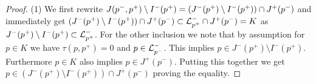 \begin{proof}
(1) We first rewrite $J(p^-,p^+)\setminus I^-(p^+)=(J^-(p^+)\setminus I^-(p^+))\cap J^+(p^-)$ and immediately get $(J^-(p^+)\setminus I^-(p^+))\cap J^+(p^-)\subset {\mathcal{L}}^-_{p^+}\cap J^+(p^-)=K$ as $J^-(p^+)\setminus I^-(p^+)\subset {\mathcal{L}}^-_{p^+}$. For the other inclusion we note that by assumption for $p\in K$ we have $\tau(p,p^+)=0$ and $p\in {\mathcal{L}}_{p^-}^-$. This implies $p\in J^-(p^+)\setminus I^-(p^+)$. Furthermore $p\in K$ also implies $p\in J^+(p^-)$. Putting this together we get $p\in (J^-(p^+)\setminus I^-(p^+))\cap J^+(p^-)$ proving the equality.






\end{proof}
